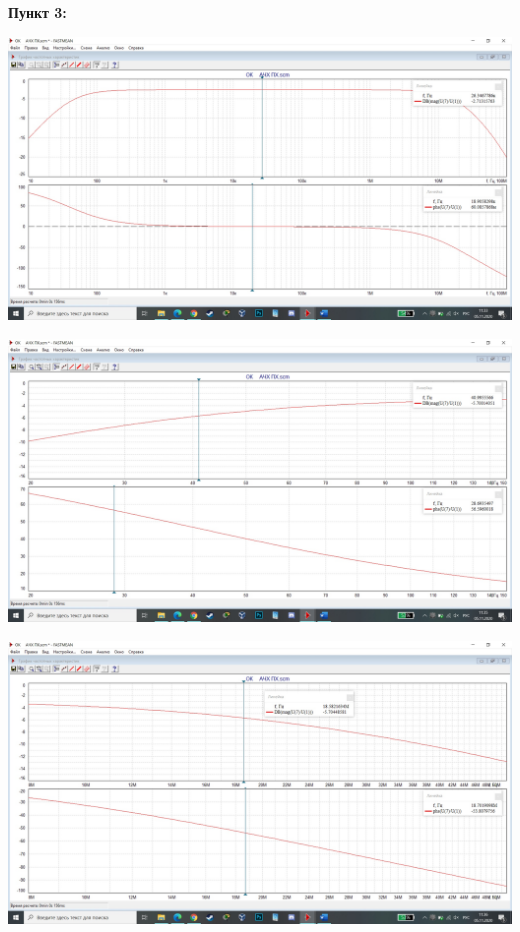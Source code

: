 \documentclass[a4paper,14pt]{extarticle}
\begin{document}
    
    \textbf{Пункт 3:}
    \begin{center}
        \includegraphics[scale=0.25]{3.jpg}
    \end{center}
    \begin{center}
        \includegraphics[scale=0.25]{4.jpg}
    \end{center}
    \begin{center}
        \includegraphics[scale=0.25]{5.jpg}
    \end{center}
\end{document}
